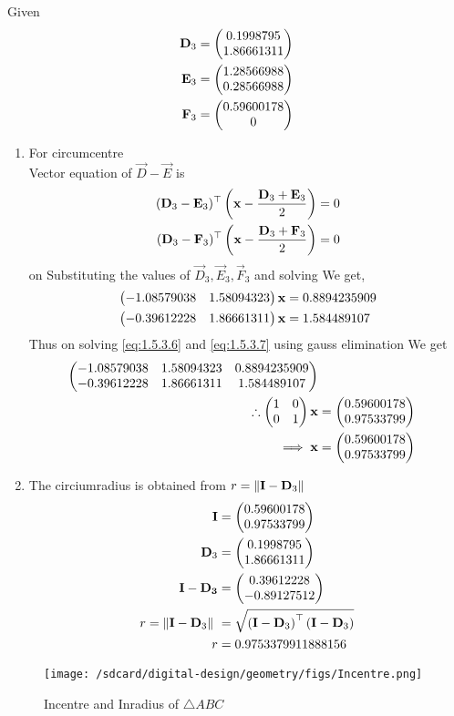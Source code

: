 \documentclass[11pt]{book}
\begin{document}
\begin{enumerate}[label=\thesection.\arabic*.,ref=\thesection.\theenumi]
\solution Given 
\begin{align}
    \mathbf{D}_3 &= \begin{pmatrix}0.1998795  \\ 1.86661311\end{pmatrix} \\
    \mathbf{E}_3 &= \begin{pmatrix}1.28566988  \\ 0.28566988\end{pmatrix} \\
    \mathbf{F}_3 &= \begin{pmatrix}0.59600178  \\ 0\end{pmatrix} 
\end{align}
\begin{enumerate}
\item For circumcentre \\
Vector equation of $\vec{D}-\vec{E}$ is
\begin{align}
	(\mathbf{D}_3-\mathbf{E}_3)^\top\left( \mathbf{x} - \frac{\mathbf{D}_3+\mathbf{E}_3}{2}\right) = 0 \\
(\mathbf{D}_3-\mathbf{F}_3)^\top\left( \mathbf{x} - \frac{\mathbf{D}_3+\mathbf{F}_3}{2}\right) = 0
\end{align}
on Substituting the values of $\vec{D}_3, \vec{E}_3, \vec{F}_3$ and solving We get,
\begin{align}
     \myvec{-1.08579038 & 1.58094323}\vec{x} &= 0.8894235909 \label{eq:1.5.3.6} \\
     \myvec{-0.39612228 & 1.86661311}\vec{x} &= 1.584489107 \label{eq:1.5.3.7}
\end{align}
Thus on solving \eqref{eq:1.5.3.6} and \eqref{eq:1.5.3.7} using gauss elimination We get
\begin{align}
    \begin{pmatrix} -1.08579038 & 1.58094323 & 0.8894235909 \\ -0.39612228 & 1.86661311 & 1.584489107\end{pmatrix} \\
    \therefore \begin{pmatrix}1&0\\0&1\end{pmatrix}\mathbf{x} &= \begin{pmatrix}0.59600178 \\ 0.97533799\end{pmatrix}\\
\implies \mathbf{x}&=\begin{pmatrix}0.59600178 \\ 0.97533799\end{pmatrix}
\end{align}
\item The circiumradius is obtained from  $ r=\left\lVert\mathbf{I}-\mathbf{D}_3\right\rVert$
   \begin{align}
       \vec{I} &= \myvec{0.59600178 \\ 0.97533799} \\
       \vec{D}_3 &= \myvec{0.1998795  \\ 1.86661311} \\
       \vec{I - D_3} &= \myvec{0.39612228 \\-0.89127512} \\
 r= \norm{\vec{I}-\vec{D}_3}\ &=  \sqrt{\brak{\vec{I}-\vec{D}_3}^{\top}\brak{\vec{I}-\vec{D}_3}} \\
 r &= 0.9753379911888156
   \end{align}
\end{enumerate}
\begin{figure}[H]
\texttt{[image: /sdcard/digital-design/geometry/figs/Incentre.png]}
\caption{Incentre and Inradius of $\triangle ABC$}
\label{fig:fig2}
\end{figure}


\end{enumerate}
\end{document}

